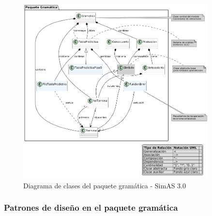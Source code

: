 \begin{figure}[H]
    \centering
    \includegraphics[width=0.9\textwidth]{figuras/Cap9/diagrama_gramatica_bueno.png}
    \caption{Diagrama de clases del paquete gramática - SimAS 3.0}
    \label{fig:diagrama_gramatica}
\end{figure}

\subsubsection{Patrones de diseño en el paquete gramática}

